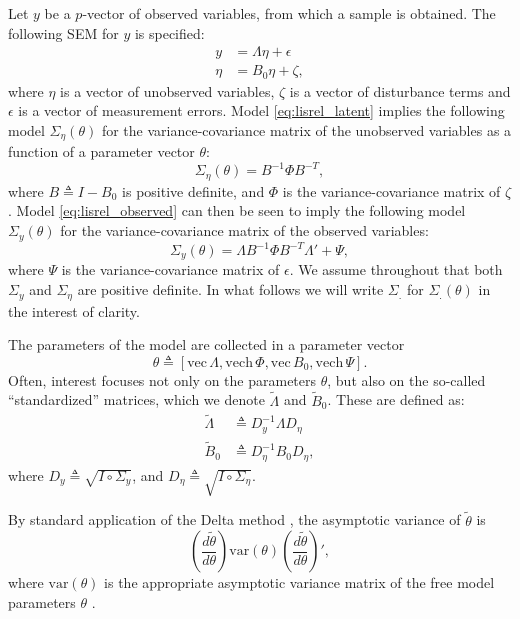 \documentclass[a4paper, 11pt]{article}
\newcommand{\n}{\eta}
\newcommand{\definedas}{\triangleq}
\newcommand{\hadaprod}{\circ}
\renewcommand{\vec}{\mathrm{vec}\,}
\newcommand{\vech}{\mathrm{vech}\,}
\newcommand{\Lambdastan}{\tilde{\Lambda}}
\newcommand{\Bstan}{\tilde{B}}
\newcommand{\thetastan}{\tilde{\theta}}
\newcommand{\0}{\boldsymbol{0}}
\newcommand{\var}{\mathrm{var}}
\begin{document}
Let $y$ be a $p$-vector of observed variables, from which a sample is obtained.
The following SEM for $y$ is specified:
\begin{align}
\label{eq:lisrel_observed}
y &= \Lambda \n + \epsilon\\
\n &= B_0 \n + \zeta,\label{eq:lisrel_latent}
\end{align}
where $\n$ is a vector of unobserved variables, $\zeta$ is a vector of
disturbance terms and $\epsilon$ is a vector of measurement errors. Model
\ref{eq:lisrel_latent} implies the following model
$\Sigma_\n(\theta)$ for the variance-covariance matrix of the unobserved
variables as a function of a parameter vector $\theta$: 
\begin{equation}\label{eq:sigma_n}
    \Sigma_\n(\theta) = B^{-1} \Phi B^{-T},
\end{equation}
where $B \definedas I - B_0$ is positive definite, 
and $\Phi$ is the variance-covariance
matrix of $\zeta$. Model \ref{eq:lisrel_observed} can then be seen to imply the
following model $\Sigma_y(\theta)$ for the variance-covariance matrix of the
observed variables:
\begin{equation}\label{eq:sigma_y}
    \Sigma_y(\theta) = \Lambda B^{-1} \Phi B^{-T} \Lambda' + \Psi,
\end{equation}
where  $\Psi$ is the variance-covariance matrix of $\epsilon$. 
We assume throughout that both $\Sigma_y$ and $\Sigma_\n$ are positive
definite. In what follows we will write $\Sigma_.$ for $\Sigma_.(\theta)$ in
the
interest of clarity.

The parameters of the model are collected in a parameter
vector $$\theta \definedas [\vec{\Lambda}, \vech{\Phi}, \vec B_0, \vech
\Psi].$$
Often, interest focuses not only on the parameters $\theta$, 
but also on the so-called ``standardized'' matrices, which we denote
$\Lambdastan$ and $\Bstan_0$. These are defined as:
\begin{align}\label{eq:lambda_s}
    \Lambdastan &\definedas D^{-1}_y \Lambda D_\n
    \\
    \Bstan_0 &\definedas D^{-1}_\n B_0 D_\n,\label{eq:beta_s}
\end{align}
where $D_y \definedas \sqrt{I \hadaprod \Sigma_y}$, and 
$D_\n \definedas \sqrt{I \hadaprod \Sigma_\n}$. 

\marginpar{TODO: Define $\thetastan$.}

By standard application of the Delta method \citep[e.g.][]{oehlert1992note}, the asymptotic variance of $\thetastan$ is 
\begin{equation}\label{eq:deltamethod}
	\left(\frac{d \thetastan}{d \theta}\right) 
		\var(\theta) 
	\left(\frac{d \thetastan}{d \theta}\right)',
\end{equation}
where $\var(\theta)$ is the appropriate asymptotic variance matrix of the free model parameters $\theta$ \cite[e.g.][]{satorra1989alternative}.
\end{document}
